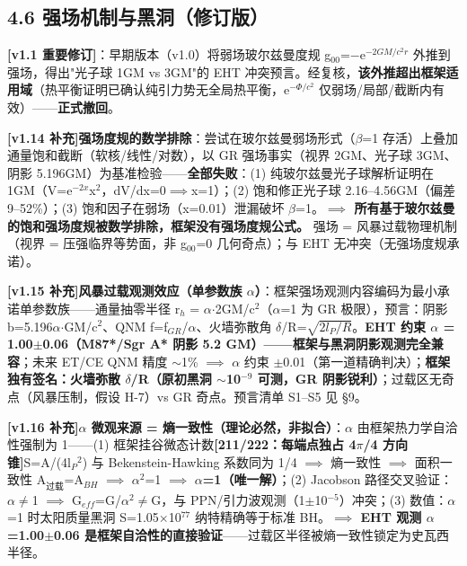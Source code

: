 \documentclass[12pt]{article}
\newcommand{\mtag}[1]{\textbf{[#1]}}
\newcommand{\up}[1]{\ensuremath{^{#1}}}
\newcommand{\down}[1]{\ensuremath{_{#1}}}
\begin{document}
\subsection{4.6 强场机制与黑洞（修订版）}

\textbf{\mtag{v1.1 重要修订}}：早期版本（v1.0）将弱场玻尔兹曼度规 g\down{00}=\ensuremath{-}e\up{-2GM/c^{2}r} 外推到强场，得出"光子球 1GM vs 3GM"的 EHT 冲突预言。经复核，\textbf{该外推超出框架适用域}（热平衡证明已确认纯引力势无全局热平衡，e\up{-\Phi{}/c^{2}} 仅弱场/局部/截断内有效）------\textbf{正式撤回}。

\textbf{\mtag{v1.14 补充}强场度规的数学排除}：尝试在玻尔兹曼弱场形式（\ensuremath{\beta}=1 存活）上叠加通量饱和截断（软核/线性/对数），以 GR 强场事实（视界 2GM、光子球 3GM、阴影 5.196GM）为基准检验------\textbf{全部失败}：(1) 纯玻尔兹曼光子球解析证明在 1GM（V=e\up{-2x}x\up{2}，dV/dx=0\ensuremath{\implies}x=1）；(2) 饱和修正光子球 2.16--4.56GM（偏差 9--52\%）；(3) 饱和因子在弱场（x=0.01）泄漏破坏 \ensuremath{\beta}=1。\textbf{\ensuremath{\implies} 所有基于玻尔兹曼的饱和强场度规被数学排除，框架没有强场度规公式。} 强场 = 风暴过载物理机制（视界 = 压强临界等势面，非 g\down{00}=0 几何奇点）；与 EHT 无冲突（无强场度规承诺）。

\textbf{\mtag{v1.15 补充}风暴过载观测效应（单参数族 \ensuremath{\alpha}）}：框架强场观测内容编码为最小承诺单参数族------通量抽零半径 r\down{h} = \ensuremath{\alpha}\ensuremath{\cdot}2GM/c\up{2}（\ensuremath{\alpha}=1 为 GR 极限），预言：阴影 b=5.196\ensuremath{\alpha}\ensuremath{\cdot}GM/c\up{2}、QNM f=f\down{GR}/\ensuremath{\alpha}、火墙弥散角 \ensuremath{\delta}/R=\ensuremath{\sqrt{2l\down{P}/R}}。\textbf{EHT 约束 \ensuremath{\alpha} = 1.00\ensuremath{\pm}0.06（M87*/Sgr A* 阴影 5.2 GM）------框架与黑洞阴影观测完全兼容}；未来 ET/CE QNM 精度 \ensuremath{\sim}1\% \ensuremath{\implies} \ensuremath{\alpha} 约束 \ensuremath{\pm}0.01（第一道精确判决）；\textbf{框架独有签名：火墙弥散 \ensuremath{\delta}/R（原初黑洞 \ensuremath{\sim}10\up{-9} 可测，GR 阴影锐利）}；过载区无奇点（风暴压制，假设 H-7）vs GR 奇点。预言清单 S1--S5 见 \S{}9。

\textbf{\mtag{v1.16 补充}\ensuremath{\alpha} 微观来源 = 熵一致性（理论必然，非拟合）}：\ensuremath{\alpha} 由框架热力学自洽性强制为 1------(1) 框架挂谷微态计数\mtag{211/222：每端点独占 4\ensuremath{\pi}/4 方向锥}S=A/(4l\down{P}\up{2}) 与 Bekenstein-Hawking 系数同为 1/4 \ensuremath{\implies} 熵一致性 \ensuremath{\implies} 面积一致性 A\down{过载}=A\down{BH} \ensuremath{\implies} \ensuremath{\alpha}\up{2}=1 \ensuremath{\implies} \textbf{\ensuremath{\alpha}=1（唯一解）}；(2) Jacobson 路径交叉验证：\ensuremath{\alpha}\ensuremath{\neq}1 \ensuremath{\implies} G\down{eff}=G/\ensuremath{\alpha}\up{2}\ensuremath{\neq}G，与 PPN/引力波观测（1\ensuremath{\pm}10\up{-5}）冲突；(3) 数值：\ensuremath{\alpha}=1 时太阳质量黑洞 S=1.05\ensuremath{\times}10\up{77} 纳特精确等于标准 BH。\textbf{\ensuremath{\implies} EHT 观测 \ensuremath{\alpha}=1.00\ensuremath{\pm}0.06 是框架自洽性的直接验证}------过载区半径被熵一致性锁定为史瓦西半径。
\end{document}
